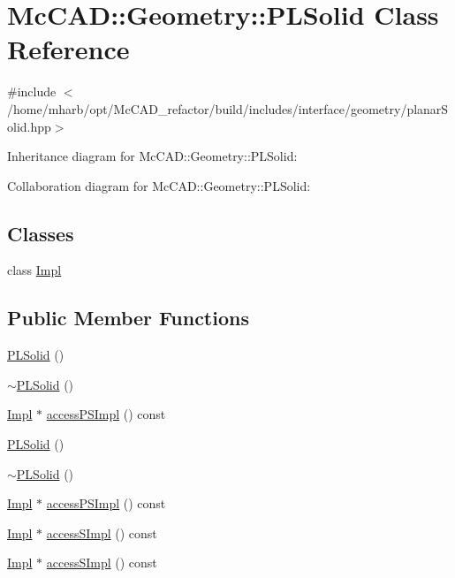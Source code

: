 \hypertarget{classMcCAD_1_1Geometry_1_1PLSolid}{}\section{Mc\+C\+AD\+:\+:Geometry\+:\+:P\+L\+Solid Class Reference}
\label{classMcCAD_1_1Geometry_1_1PLSolid}


{\ttfamily \#include $<$/home/mharb/opt/\+Mc\+C\+A\+D\+\_\+refactor/build/includes/interface/geometry/planar\+Solid.\+hpp$>$}



Inheritance diagram for Mc\+C\+AD\+:\+:Geometry\+:\+:P\+L\+Solid\+:


Collaboration diagram for Mc\+C\+AD\+:\+:Geometry\+:\+:P\+L\+Solid\+:
\subsection*{Classes}
\begin{DoxyCompactItemize}
\item 
class \hyperlink{classMcCAD_1_1Geometry_1_1PLSolid_1_1Impl}{Impl}
\end{DoxyCompactItemize}
\subsection*{Public Member Functions}
\begin{DoxyCompactItemize}
\item 
\hyperlink{classMcCAD_1_1Geometry_1_1PLSolid_a27c914f54302cb367c1368eb999ca82a}{P\+L\+Solid} ()
\item 
\hyperlink{classMcCAD_1_1Geometry_1_1PLSolid_a8e6f560520c5912f097d553033774c42}{$\sim$\+P\+L\+Solid} ()
\item 
\hyperlink{classMcCAD_1_1Geometry_1_1PLSolid_1_1Impl}{Impl} $\ast$ \hyperlink{classMcCAD_1_1Geometry_1_1PLSolid_aea7b957208b17a48340cf97e1395f658}{access\+P\+S\+Impl} () const
\item 
\hyperlink{classMcCAD_1_1Geometry_1_1PLSolid_a27c914f54302cb367c1368eb999ca82a}{P\+L\+Solid} ()
\item 
\hyperlink{classMcCAD_1_1Geometry_1_1PLSolid_a8e6f560520c5912f097d553033774c42}{$\sim$\+P\+L\+Solid} ()
\item 
\hyperlink{classMcCAD_1_1Geometry_1_1PLSolid_1_1Impl}{Impl} $\ast$ \hyperlink{classMcCAD_1_1Geometry_1_1PLSolid_a6c79176fc7a126bea68fbc5ae82eb1d9}{access\+P\+S\+Impl} () const
\item 
\hyperlink{classMcCAD_1_1Geometry_1_1PLSolid_1_1Impl}{Impl} $\ast$ \hyperlink{classMcCAD_1_1Geometry_1_1Solid_a41304db7cdf4762342ea833b15764180}{access\+S\+Impl} () const
\item 
\hyperlink{classMcCAD_1_1Geometry_1_1PLSolid_1_1Impl}{Impl} $\ast$ \hyperlink{classMcCAD_1_1Geometry_1_1Solid_a1d058cac2d5619e21813a16706dc1826}{access\+S\+Impl} () const
\end{DoxyCompactItemize}
